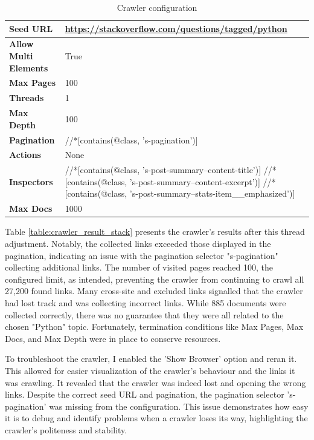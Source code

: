 {\begin{table}[ht] 
{\footnotesize
\begin{tabular}{ P{3cm} ||P{10.1cm}  }      %
 \hline \hline
\textbf{Seed URL} & \href{https://stackoverflow.com/questions/tagged/python}{https://stackoverflow.com/questions/tagged/python}\T\B 
\\ 
\hline
\textbf{Allow Multi Elements} & True \T\B 
\\ 
\hline
\textbf{Max Pages} & 100\T\B 
\\ 
\hline
\textbf{Threads} & 1\T\B 
\\ 
\hline
\textbf{Max Depth} & 100\T\B 
\\ 
\hline
\textbf{Pagination} & //*[contains(@class, 's-pagination')]\T\B 
\\ 
\hline
\textbf{Actions} & None\T\B 
\\ 
\hline
\textbf{Inspectors} & //*[contains(@class, 's-post-summary--content-title')]\T\B  \newline
//*[contains(@class, 's-post-summary--content-excerpt')]	
 \newline
//*[contains(@class, 's-post-summary--stats-item\_\_emphasized')]	
\\ 
\hline
\textbf{Max Docs} & 1000\T\B 
\\ 
\hline \hline
    \end{tabular}
}
  \captionsetup{justification=centering,margin=2cm}
  \caption{Crawler configuration}
  \label{table:crawler_conf_stack}
\end{table}


Table \ref{table:crawler_result_stack} presents the crawler's results after this thread adjustment. Notably, the collected links exceeded those displayed in the pagination, indicating an issue with the pagination selector "s-pagination" collecting additional links. The number of visited pages reached 100, the configured limit, as intended, preventing the crawler from continuing to crawl all 27,200 found links. Many cross-site and excluded links signalled that the crawler had lost track and was collecting incorrect links. While 885 documents were collected correctly, there was no guarantee that they were all related to the chosen "Python" topic. Fortunately, termination conditions like Max Pages, Max Docs, and Max Depth were in place to conserve resources.

To troubleshoot the crawler, I enabled the 'Show Browser' option and reran it. This allowed for easier visualization of the crawler's behaviour and the links it was crawling. It revealed that the crawler was indeed lost and opening the wrong links. Despite the correct seed URL and pagination, the pagination selector 's-pagination' was missing from the configuration. This issue demonstrates how easy it is to debug and identify problems when a crawler loses its way, highlighting the crawler's politeness and stability.


}
